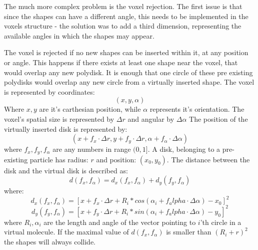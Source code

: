 \documentclass[12pt, oneside]{report}
\begin{document}
The much more complex problem is the voxel rejection. The first issue is that since the shapes can have a different angle, this needs to be implemented in the voxels structure - the solution was to add a third dimension, representing the available angles in which the shapes may appear. \newline

The voxel is rejected if no new shapes can be inserted within it, at any position or angle. This happens if there exists at least one shape near the voxel, that would overlap any new polydisk. It is enough that one circle of these pre existing polydisks would overlap any new circle from a virtually inserted shape.
The voxel is represented by coordinates:
\begin{equation*}
(x,y,\alpha)
\end{equation*}
Where $x,y$ are it's carthesian position, while $\alpha$ represents it's orientation. \newline
The voxel's spatial size is represented by $\Delta r$ and angular by $\Delta \alpha$ \newline
The position of the virtually inserted disk is represented by:
\begin{equation*}
(x+f_x \cdot \Delta r, y + f_y \cdot \Delta r, \alpha + f_{\alpha} \cdot \Delta \alpha)
\end{equation*}
where $f_x,f_y,f_{\alpha}$ are any numbers in range $(0,1]$. \newline
A disk, belonging to a pre-existing particle has radius: $r$ and position: $(x_0,y_0)$. The distance between the disk and the virtual disk is described as: \newline
\begin{equation*}
d(f_x,f_{\alpha})=d_x(f_x,f_{\alpha})+d_y(f_y,f_{\alpha})
\end{equation*}
where: \newline
\begin{equation*}
d_x(f_x,f_{\alpha})=[x+f_x \cdot \Delta r + R_i * cos(\alpha_i+f_alpha \cdot \Delta \alpha)-x_0]^2
\end{equation*}
\begin{equation*}
d_y(f_y,f_{\alpha})=[x+f_y \cdot \Delta r + R_i * sin(\alpha_i+f_alpha \cdot \Delta \alpha)-y_0]^2
\end{equation*}
where $R_i, \alpha_i$ are the length and angle of the vector pointing to $i$'th circle in a virtual molecule. \newline
If the maximal value of $d(f_x,f_{\alpha})$ is smaller than $(R_i + r)^2$ the shapes will always collide. \newline
\end{document}

